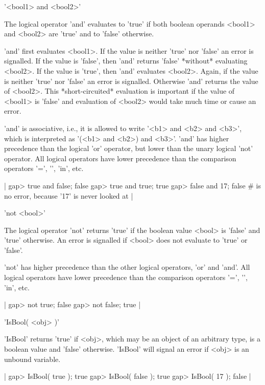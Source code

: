 '<bool1> and <bool2>'

The  logical operator 'and' evaluates  to 'true' if both boolean operands
<bool1> and <bool2> are 'true' and to 'false' otherwise.

'and'  first evaluates  <bool1>.    If the value   is neither 'true'  nor
'false' an  error is signalled.   If the  value  is 'false',  then  'and'
returns 'false'  *without* evaluating <bool2>.  If  the value is  'true',
then 'and' evaluates <bool2>.  Again, if the value  is neither 'true' nor
'false' an  error is signalled.   Otherwise   'and' returns the  value of
<bool2>.  This *short-circuited* evaluation is important if the  value of
<bool1> is 'false'  and evaluation  of   <bool2> would take much time  or
cause an error.

'and' is  associative, i.e., it is  allowed  to write '<b1>  and <b2> and
<b3>',  which is interpreted  as '(<b1> and <b2>)  and  <b3>'.  'and' has
higher precedence than  the  logical 'or' operator,  but lower  than  the
unary  logical 'not'  operator.    All   logical operators  have    lower
precedence than the comparison operators '=', '\<', 'in', etc.

|    gap> true and false;
    false
    gap> true and true;
    true
    gap> false and 17;
    false    # is no error, because '17' is never looked at |

'not <bool>'

The logical operator 'not' returns 'true'  if the boolean value <bool> is
'false' and 'true' otherwise.  An error is  signalled if <bool>  does not
evaluate to 'true' or 'false'.

'not' has higher  precedence than the  other logical operators,  'or' and
'and'.  All logical operators  have lower precedence than  the comparison
operators '=', '\<', 'in', etc.

|    gap> not true;
    false
    gap> not false;
    true |

%

'IsBool( <obj> )'

'IsBool' returns 'true' if <obj>, which may  be an object of an arbitrary
type, is a boolean value and 'false' otherwise.  'IsBool' will  signal an
error if <obj> is an unbound variable.

|    gap> IsBool( true );
    true
    gap> IsBool( false );
    true
    gap> IsBool( 17 );
    false |




